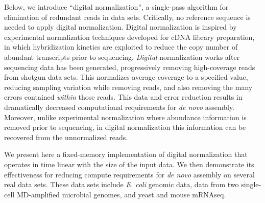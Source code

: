 Below, we introduce ``digital normalization'', a single-pass algorithm
for elimination of redundant reads in data sets.  Critically, no
reference sequence is needed to apply digital normalization.  Digital
normalization is inspired by experimental normalization techniques
developed for cDNA library preparation, in which hybridization
kinetics are exploited to reduce the copy number of abundant
transcripts prior to sequencing\cite{pubmed8889548,pubmed7937745}.
{\em Digital} normalization works after sequencing data has been
generated, progressively removing high-coverage reads from shotgun
data sets.  This normalizes average coverage to a specified value,
reducing sampling variation while removing reads, and also removing
the many errors contained {\em within} those reads.  This data and
error reduction results in dramatically decreased computational
requirements for {\em de novo} assembly.  Moreover, unlike experimental
normalization where abundance information is removed prior to sequencing,
in digital normalization this information can be recovered from the
unnormalized reads.




We present here a fixed-memory implementation of digital normalization
that operates in time linear with the size of the input data.  We then
demonstrate its effectiveness for reducing compute requirements for
{\em de novo} assembly on several real data sets.  These data sets
include {\em E. coli} genomic data, data from two single-cell
MD-amplified microbial genomes, and yeast and mouse mRNAseq.

